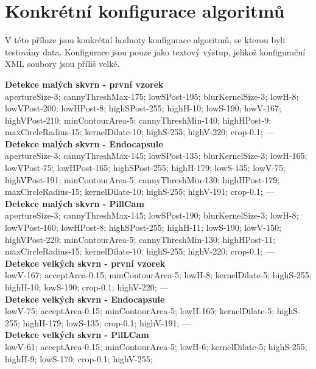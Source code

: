 \chapter{Konkrétní konfigurace algoritmů}
\label{sec:prilohaHodnoty}
V této příloze jsou konkrétní hodnoty konfigurace algoritmů, se kterou byli testovány data. Konfigurace jsou pouze jako textový výstup, jelikož konfigurační XML soubory jsou příliš velké.

\noindent
\begin{flushleft}
\textbf{Detekce malých skvrn - první vzorek\\}
apertureSize-3;
cannyThreshMax-175;
lowSPost-195;
blurKernelSize-3;
lowH-8;
lowVPost-200;
lowHPost-8;
highSPost-255;
highH-10;
lowS-190;
lowV-167;
highVPost-210;
minContourArea-5;
cannyThreshMin-140;
highHPost-9;
maxCircleRadius-15;
kernelDilate-10;
highS-255;
highV-220;
crop-0.1;
---\\
\textbf{Detekce malých skvrn - Endocapsule\\}
apertureSize-3;
cannyThreshMax-145;
lowSPost-135;
blurKernelSize-3;
lowH-165;
lowVPost-75;
lowHPost-165;
highSPost-255;
highH-179;
lowS-135;
lowV-75;
highVPost-191;
minContourArea-5;
cannyThreshMin-130;
highHPost-179;
maxCircleRadius-15;
kernelDilate-10;
highS-255;
highV-191;
crop-0.1;
---\\
\textbf{Detekce malých skvrn - PillCam\\}
apertureSize-3;
cannyThreshMax-145;
lowSPost-190;
blurKernelSize-3;
lowH-8;
lowVPost-160;
lowHPost-8;
highSPost-255;
highH-11;
lowS-190;
lowV-150;
highVPost-220;
minContourArea-5;
cannyThreshMin-130;
highHPost-11;
maxCircleRadius-15;
kernelDilate-10;
highS-255;
highV-220;
crop-0.1;
---\\
\textbf{Detekce velkých skvrn - první vzorek\\}
lowV-167;
acceptArea-0.15;
minContourArea-5;
lowH-8;
kernelDilate-5;
highS-255;
highH-10;
lowS-190;
crop-0.1;
highV-220;
---\\
\textbf{Detekce velkých skvrn - Endocapsule\\}
lowV-75;
acceptArea-0.15;
minContourArea-5;
lowH-165;
kernelDilate-5;
highS-255;
highH-179;
lowS-135;
crop-0.1;
highV-191;
---\\
\textbf{Detekce velkých skvrn - PilLCam\\}
lowV-61;
acceptArea-0.15;
minContourArea-5;
lowH-6;
kernelDilate-5;
highS-255;
highH-9;
lowS-170;
crop-0.1;
highV-255;
\end{flushleft}